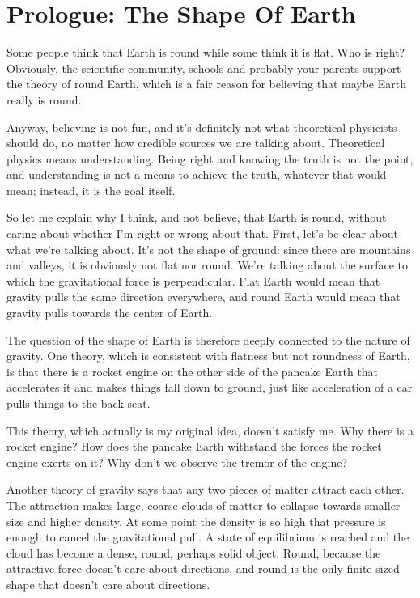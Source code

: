 \documentclass[11pt,oneside%
]{memoir}
\begin{document}
\frontmatter
\chapter{Prologue: The Shape Of Earth}

Some people think that Earth is round while some think it is flat. Who is right? Obviously, the scientific community, schools and probably your parents support the theory of round Earth, which is a fair reason for believing that maybe Earth really is round.

Anyway, believing is not fun, and it's definitely not what theoretical physicists should do, no matter how credible sources we are talking about. Theoretical physics means understanding. Being right and knowing the truth is not the point, and understanding is not a means to achieve the truth, whatever that would mean; instead, it is the goal itself.

So let me explain why I think, and not believe, that Earth is round, without caring about whether I'm right or wrong about that. First, let's be clear about what we're talking about. It's not the shape of ground: since there are mountains and valleys, it is obviously not flat nor round. We're talking about the surface to which the gravitational force is perpendicular. Flat Earth would mean that gravity pulls the same direction everywhere, and round Earth would mean that gravity pulls towards the center of Earth.

The question of the shape of Earth is therefore deeply connected to the nature of gravity. One theory, which is consistent with flatness but not roundness of Earth, is that there is a rocket engine on the other side of the pancake Earth that accelerates it and makes things fall down to ground, just like acceleration of a car pulls things to the back seat.

This theory, which actually is my original idea, doesn't satisfy me. Why there is a rocket engine? How does the pancake Earth withstand the forces the rocket engine exerts on it? Why don't we observe the tremor of the engine?

Another theory of gravity says that any two pieces of matter attract each other. The attraction makes large, coarse clouds of matter to collapse towards smaller size and higher density. At some point the density is so high that pressure is enough to cancel the gravitational pull. A state of equilibrium is reached and the cloud has become a dense, round, perhaps solid object. Round, because the attractive force doesn't care about directions, and round is the only finite-sized shape that doesn't care about directions.
\end{document}
